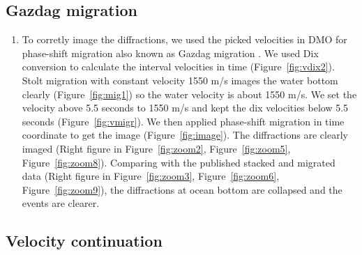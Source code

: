 \subsection{Gazdag migration}

\begin{enumerate}

\item To corretly image the diffractions, we used the picked velocities in DMO for phase-shift migration also known as Gazdag migration \cite[]{GEO43-07-13421351}. We used Dix conversion to calculate the interval velocities in time (Figure~\ref{fig:vdix2}). Stolt migration with constant velocity 1550 m/s images the water bottom clearly (Figure~\ref{fig:mig1}) so the water velocity is about 1550 m/s. We set the velocity above 5.5 seconds to 1550 m/s and kept the dix velocities below 5.5 seconds (Figure~\ref{fig:vmigr}). We then applied phase-shift migration in time coordinate to get the image (Figure~\ref{fig:image}). The diffractions are clearly imaged (Right figure in Figure~\ref{fig:zoom2}, Figure~\ref{fig:zoom5}, Figure~\ref{fig:zoom8}). Comparing with the published stacked and migrated data (Right figure in Figure~\ref{fig:zoom3}, Figure~\ref{fig:zoom6}, Figure~\ref{fig:zoom9}), the diffractions at ocean bottom are collapsed and the events are clearer.


\end{enumerate}\clearpage

\subsection{Velocity continuation}

